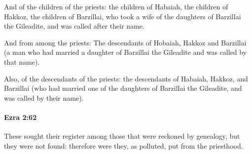 			\begin{versebox}
					\item[BHS] 
					\item[LXX] 
					\item[ASV] And of the children of the priests: the children of Habaiah, the children of Hakkoz, the children of Barzillai, who took a wife of the daughters of Barzillai the Gileadite, and was called after their name.
					\item[NIV] And from among the priests: The descendants of Hobaiah, Hakkoz and Barzillai (a man who had married a daughter of Barzillai the Gileadite and was called by that name).
					\item[NRSV] Also, of the descendants of the priests: the descendants of Habaiah, Hakkoz, and Barzillai (who had married one of the daughters of Barzillai the Gileadite, and was called by their name).
			\end{versebox}

		\paragraph{Ezra 2:62} %
			\label{EZRA-2-62}

			These sought their register among those that were reckoned by genealogy, but they were not found: therefore were they, as polluted, put from the priesthood.

